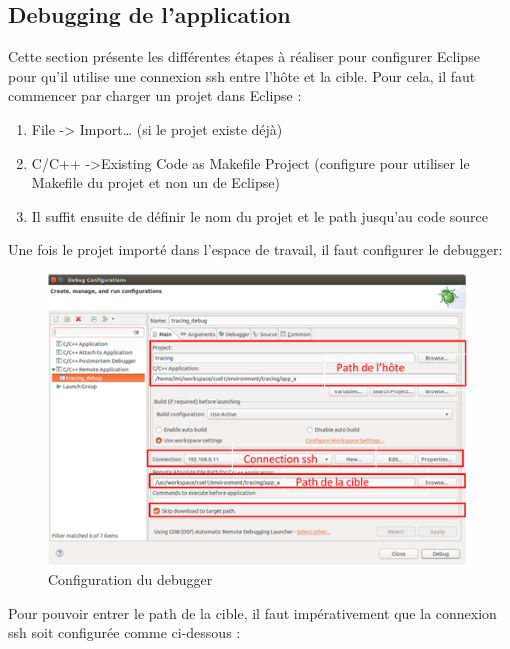 \subsection{Debugging de l'application}
Cette section présente les différentes étapes à réaliser pour configurer Eclipse pour qu’il utilise une connexion ssh entre l’hôte et la cible.
Pour cela, il faut commencer par charger un projet dans Eclipse :
\begin{enumerate}
	\item File -> Import… (si le projet existe déjà)
	\item C/C++ ->Existing Code as Makefile Project (configure pour utiliser le Makefile du projet et non un de Eclipse)
	\item Il suffit ensuite de définir le nom du projet et le path jusqu’au code source
\end{enumerate}
Une fois le projet importé dans l’espace de travail, il faut configurer le debugger:
\begin{figure}[H]
	\begin{center}
		\includegraphics[width=14cm]{img/eclipseConfig1.png}
		\caption{Configuration du debugger}
		\label{eclipseConfig1}
	\end{center}
\end{figure}
Pour pouvoir entrer le path de la cible, il faut impérativement que la connexion ssh soit configurée comme ci-dessous :
